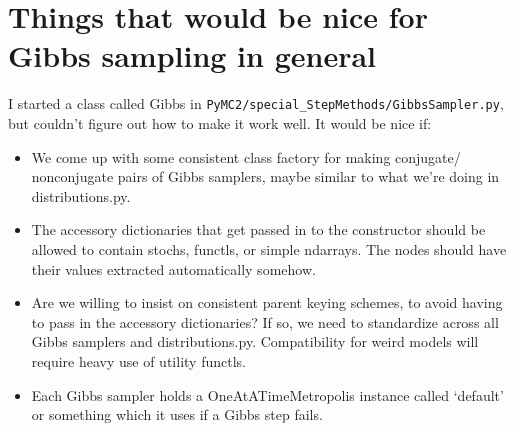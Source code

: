 \documentclass{article}
\begin{document}
\section{Things that would be nice for Gibbs sampling in general}
I started a class called Gibbs in \texttt{PyMC2/special\_StepMethods/GibbsSampler.py}, but couldn't figure out how to make it work well. It would be nice if:  
\begin{itemize}
	\item We come up with some consistent class factory for making conjugate/ nonconjugate pairs of Gibbs samplers, maybe similar to what we're doing in distributions.py.	
	\item The accessory dictionaries that get passed in to the constructor should be allowed to contain stochs, functls, or simple ndarrays. The nodes should have their values extracted automatically somehow.
	\item Are we willing to insist on consistent parent keying schemes, to avoid having to pass in the accessory dictionaries? If so, we need to standardize across all Gibbs samplers and distributions.py. Compatibility for weird models will require heavy use of utility functls.
	\item Each Gibbs sampler holds a OneAtATimeMetropolis instance called `default' or something which it uses if a Gibbs step fails.
\end{itemize} 
\end{document}
